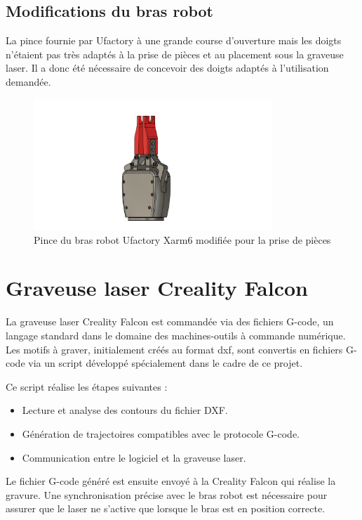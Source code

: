\subsection{Modifications du bras robot}
La pince fournie par Ufactory à une grande course d'ouverture mais les doigts n'étaient pas très adaptés à la prise de pièces et au placement sous la graveuse laser. Il a donc été nécessaire de concevoir des doigts adaptés à l'utilisation demandée.
\begin{figure}[H]
    \centering
    \includegraphics[width=0.8\textwidth]{assets/figures/Pince_Xarm6.png}
    \caption{Pince du bras robot Ufactory Xarm6 modifiée pour la prise de pièces}
    \label{fig:pince_robot}
\end{figure}

\section{Graveuse laser Creality Falcon}

La graveuse laser Creality Falcon est commandée via des fichiers G-code, un langage standard dans le domaine des machines-outils à commande numérique. Les motifs à graver, initialement créés au format \gls{dxf}, sont convertis en fichiers G-code via un script développé spécialement dans le cadre de ce projet.

Ce script réalise les étapes suivantes :
\begin{itemize}
    \item Lecture et analyse des contours du fichier DXF.
    \item Génération de trajectoires compatibles avec le protocole G-code.
    \item Communication entre le logiciel et la graveuse laser.
\end{itemize}

Le fichier G-code généré est ensuite envoyé à la Creality Falcon qui réalise la gravure. Une synchronisation précise avec le bras robot est nécessaire pour assurer que le laser ne s’active que lorsque le bras est en position correcte.

